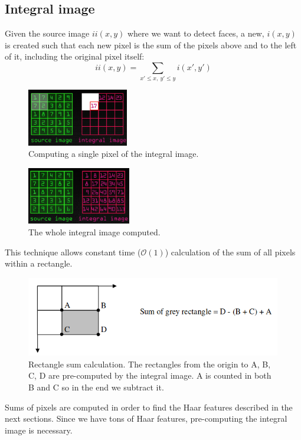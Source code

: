 \documentclass[a4paper]{article}
\begin{document}
\subsection{Integral image}
Given the source image $ii(x,y)$ where we want to detect faces, a new,   $i(x,y)$ is  created such that each  new pixel is the sum of the pixels above and to the left of it, including the original pixel itself:
\begin{equation}
    ii(x,y) = \sum\limits_{x\prime \leq x,\ y\prime \leq y} i(x\prime, y\prime)
\end{equation}
\begin{multicols}{2}
\begin{figure}[H]
    \centering
    \includegraphics[height=2.5cm]{img/int_image_one_pixel.png}
    \caption{Computing a single pixel of the integral image.}
\end{figure}
\columnbreak
\begin{figure}[H]
    \centering
    \includegraphics[height=2.5cm]{img/int_image_whole.png}
    \caption{The whole integral image computed.}
\end{figure}
\end{multicols}
This technique allows constant time ($\mathcal{O}(1)$) calculation of the sum of all pixels within a rectangle. 
\begin{figure}[H]
    \centering
    \includegraphics[height=3.5cm]{img/int_image_rectangle.png}
    \caption{Rectangle sum calculation. The rectangles from the origin to A, B, C, D are pre-computed by the integral image. A is counted in both B and C so in the end we subtract it.}
    \label{fig:my_label}
\end{figure}
Sums of pixels are computed in order to find the Haar features described in the next sections. Since we have tons of Haar features, pre-computing the integral image is necessary.
\end{document}
